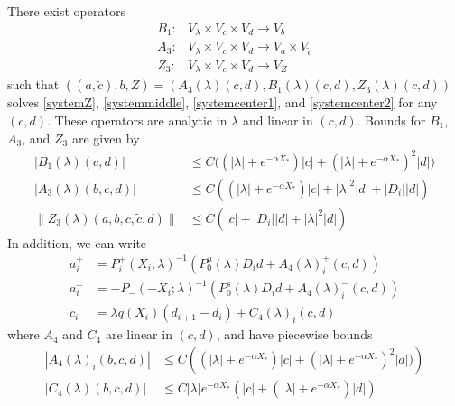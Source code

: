 \documentclass[thesis.tex]{subfiles}
\begin{document}
\begin{lemma}\label{Zinv2}
There exist operators
\begin{align*}
B_1: &V_\lambda \times V_c \times V_d \rightarrow V_b \\
A_3: &V_\lambda \times V_c \times V_d \rightarrow V_a \times V_{\tilde{c}} \\
Z_3: &V_\lambda \times V_c \times V_d \rightarrow V_Z
\end{align*}
such that $( (a, \tilde{c}) , b, Z ) = ( A_3(\lambda)(c, d), B_1(\lambda)(c, d), Z_3(\lambda)(c, d) )$ solves \eqref{systemZ}, \eqref{systemmiddle}, \eqref{systemcenter1}, and \eqref{systemcenter2} for any $(c, d)$. These operators are analytic in $\lambda$ and linear in $(c, d)$. Bounds for $B_1$, $A_3$, and $Z_3$ are given by
\begin{align}
|B_1(\lambda)(c, d)| &\leq C\Big( (|\lambda| + e^{-\alpha X_*})|c| + (|\lambda| + e^{-\alpha X_*})^2 |d| \Big) \label{B1bound} \\
|A_3(\lambda)(b, c, d)| &\leq C \left( (|\lambda| + e^{-\alpha X_*})|c| + |\lambda|^2 |d| + |D_i||d| \right) \label{A3bound} \\
\| Z_3(\lambda)(a,b,c,\tilde{c},d) \| &\leq C\left(|c| + |D_i||d| + |\lambda|^2|d|\right) \label{Z3bound}
\end{align} 
In addition, we can write
\begin{align*}
a_i^+ &= P_i^+(X_i; \lambda)^{-1} \left( P_0^u(\lambda) D_i d + A_4(\lambda)_i^+(c, d) \right) \\
a_i^- &= -P_-(-X_i; \lambda)^{-1} \left( P_0^s(\lambda) D_i d + A_4(\lambda)_i^-(c, d) \right) \\
\tilde{c}_i &= \lambda q(X_i)(d_{i+1} - d_i ) + C_4(\lambda)_i(c, d) 
\end{align*}
where $A_4$ and $C_4$ are linear in $(c, d)$, and have piecewise bounds
\begin{align}
|A_4(\lambda)_i(b, c, d)|
&\leq C \left( (|\lambda| + e^{-\alpha X_*})|c| + (|\lambda| + e^{-\alpha X_*})^2 |d| ) \right)  \label{A4bound} \\
|C_4(\lambda)(b, c, d)| &\leq C |\lambda| e^{-\alpha X_*} \left( |c| + (|\lambda| + e^{-\alpha X_*}) |d| \right) \label{C4bound}
\end{align}


\end{lemma}
\end{document}

